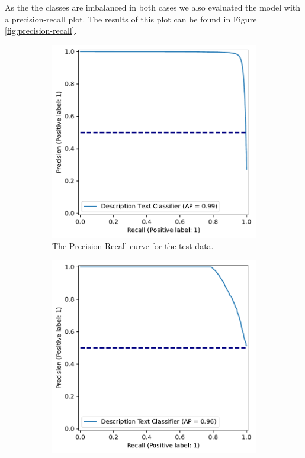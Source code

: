 \documentclass[a4paper, 12pt, oneside]{book} %
\begin{document}
As the the classes are imbalanced in both cases we also evaluated the model with a precision-recall plot.
The results of this plot can be found in Figure \ref{fig:precision-recall}.
\begin{figure} [h!]
     \centering
     \begin{subfigure}[b]{0.49\textwidth}
         \centering
         \includegraphics[width=\textwidth]{precision_recall_plot.pdf}
         \caption{The Precision-Recall curve for the test data.}
         \label{fig:precision_recall_curve_test}
     \end{subfigure}
     \hfill
     \begin{subfigure}[b]{0.49\textwidth}
         \centering
         \includegraphics[width=\textwidth]{precision_recall_plot_extern.pdf}

\end{subfigure}
\end{figure}
\end{document}
